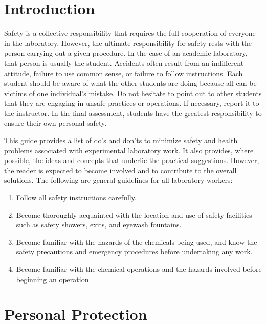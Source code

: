 \documentclass[letterpaper,10pt,english]{sphinxmanual}
\begin{document}
\section{Introduction}
\label{\detokenize{Laboratory_Safety/Laboratory_Safety:introduction}}\label{\detokenize{Laboratory_Safety/Laboratory_Safety:heading-laboratory-safety-introduction}}
Safety is a collective responsibility that requires the full cooperation of everyone in the laboratory. However, the ultimate responsibility for safety rests with the person carrying out a given procedure. In the case of an academic laboratory, that person is usually the student. Accidents often result from an indifferent attitude, failure to use common sense, or failure to follow instructions. Each student should be aware of what the other students are doing because all can be victims of one individual’s mistake. Do not hesitate to point out to other students that they are engaging in unsafe practices or operations. If necessary, report it to the instructor. In the final assessment, students have the greatest responsibility to ensure their own personal safety.

This guide provides a list of do’s and don’ts to minimize safety and health problems associated with experimental laboratory work. It also provides, where possible, the ideas and concepts that underlie the practical suggestions. However, the reader is expected to become involved and to contribute to the overall solutions. The following are general guidelines for all laboratory workers:
\begin{enumerate}
\item {} 
Follow all safety instructions carefully.

\item {} 
Become thoroughly acquainted with the location and use of safety facilities such as safety showers, exits, and eyewash fountains.

\item {} 
Become familiar with the hazards of the chemicals being used, and know the safety precautions and emergency procedures before undertaking any work.

\item {} 
Become familiar with the chemical operations and the hazards involved before beginning an operation.

\end{enumerate}


\section{Personal Protection}
\label{\detokenize{Laboratory_Safety/Laboratory_Safety:personal-protection}}\label{\detokenize{Laboratory_Safety/Laboratory_Safety:heading-laboratory-safety-personal-protection}}
\end{document}
